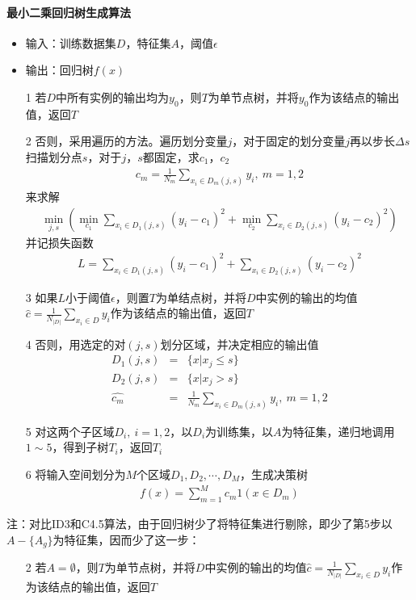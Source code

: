 \paragraph{最小二乘回归树生成算法}
\begin{itemize}
\item 输入：训练数据集$D$，特征集$A$，阈值$\epsilon$
\item 输出：回归树$f(x)$
\item[1] 若$D$中所有实例的输出均为$y_0$，则$T$为单节点树，并将$y_0$作为该结点的输出值，返回$T$
\item[2] 否则，采用遍历的方法。遍历划分变量$j$，对于固定的划分变量$j$再以步长$\Delta s$扫描划分点$s$，对于$j$，$s$都固定，求$c_1$，$c_2$
\begin{eqnarray}
c_m=\frac{1}{N_m}\sum_{x_i\in D_m(j,s)}y_i,\ m=1,2
\end{eqnarray}
来求解
\begin{eqnarray}
\min_{j,s}
\left(
	\min_{c_1}\sum_{x_i\in D_1(j,s)}(y_i-c_1)^2+\min_{c_2}\sum_{x_i\in D_2(j,s)}(y_i-c_2)^2
\right)
\end{eqnarray}
并记损失函数
\begin{eqnarray}
L=\sum_{x_i\in D_1(j,s)}(y_i-c_1)^2+\sum_{x_i\in D_2(j,s)}(y_i-c_2)^2
\end{eqnarray}
\item[3] 如果$L$小于阈值$\epsilon$，则置$T$为单结点树，并将$D$中实例的输出的均值$\hat{c}=\frac{1}{N_{|D|}}\sum_{x_i\in D}y_i$作为该结点的输出值，返回$T$
\item[4] 否则，用选定的对$(j,s)$划分区域，并决定相应的输出值
\begin{eqnarray}
D_1(j,s)&=&\{x|x_j\leq s\}\\
D_2(j,s)&=&\{x|x_j> s\}\\
\hat{c_m}&=&\frac{1}{N_m}\sum_{x_i\in D_m(j,s)}y_i,\ m=1,2
\end{eqnarray}
\item[5] 对这两个子区域$D_i,\ i=1,2$，以$D_i$为训练集，以$A$为特征集，递归地调用$1\sim 5$，得到子树$T_i$，返回$T_i$
\item[6] 将输入空间划分为$M$个区域$D_1,D_2,\cdots,D_M$，生成决策树
\begin{eqnarray}
f(x)=\sum_{m=1}^M c_m1(x\in D_m)
\end{eqnarray}
\end{itemize}


注：对比ID3和C4.5算法，由于回归树少了将特征集进行剔除，即少了第5步以$A-\{A_g\}$为特征集，因而少了这一步：
\begin{itemize}
\item[2] 若$A=\emptyset$，则$T$为单节点树，并将$D$中实例的输出的均值$\hat{c}=\frac{1}{N_{|D|}}\sum_{x_i\in D}y_i$作为该结点的输出值，返回$T$
\end{itemize}

